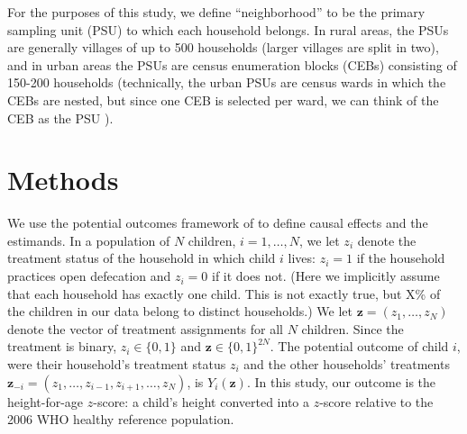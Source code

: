 \documentclass[11pt,a4paper]{article}
\begin{document}
For the purposes of this study, we define ``neighborhood'' to be the primary sampling unit (PSU) to which each household belongs. In rural areas, the PSUs are generally villages of up to 500 households (larger villages are split in two), and in urban areas the PSUs are census enumeration blocks (CEBs) consisting of 150-200 households (technically, the urban PSUs are census wards in which the CEBs are nested, but since one CEB is selected per ward, we can think of the CEB as the PSU \citep{roy_acharya}).




\section{Methods}
We use the potential outcomes framework of \cite{rubin1978} to define causal effects and the estimands. In a population of $N$ children, $i = 1, \ldots, N$, we let $z_i$ denote the treatment status of the household in which child $i$ lives: $z_i = 1$ if the household practices open defecation and $z_i = 0$ if it does not. (Here we implicitly assume that each household has exactly one child. This is not exactly true, but X\% of the children in our data belong to distinct households.) We let $\mathbf{z} = (z_1, \ldots, z_N)$ denote the vector of treatment assignments for all $N$ children. Since the treatment is binary, $z_i \in \{0, 1\}$ and $\mathbf{z} \in \{0, 1\}^{2N}$. The potential outcome of child $i$, were their household's treatment status $z_i$ and the other households' treatments $\mathbf{z}_{-i} = (z_1, \ldots, z_{i-1}, z_{i+1}, \ldots, z_N)$, is $Y_i(\mathbf{z})$. In this study, our outcome is the height-for-age $z$-score: a child's height converted into a $z$-score relative to the 2006 WHO healthy reference population.
\end{document}
